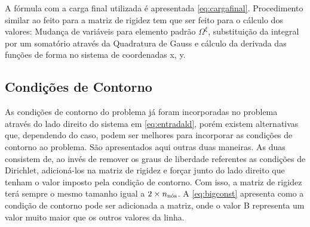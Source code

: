 A fórmula com a carga final utilizada é apresentada \eqref{eq:cargafinal}. Procedimento similar ao feito para a matriz de rigidez tem que ser feito para o cálculo dos valores: Mudança de variáveis para elemento padrão $\Omega^\xi$, substituição da integral por um somatório através da Quadratura de Gauss e cálculo da derivada das funções de forma no sistema de coordenadas x, y. 


\subsection{Condições de Contorno}

As condições de contorno do problema já foram incorporadas no problema através do lado direito do sistema em \eqref{eq:entradald}, porém existem alternativas que, dependendo do caso, podem ser melhores para incorporar as condições de contorno ao problema. São apresentados aqui outras duas maneiras. As duas consistem de, ao invés de remover os graus de liberdade referentes as condições de Dirichlet,  adicioná-los na matriz de rigidez e forçar junto do lado direito que tenham o valor imposto pela condição de contorno. Com isso, a matriz de rigidez terá sempre o mesmo tamanho igual a $2\times \qtdnos$. A  \eqref{eq:bigconst} apresenta como a condição de contorno pode ser adicionada a matriz, onde o valor B representa um valor muito maior que os outros valores da linha. 

